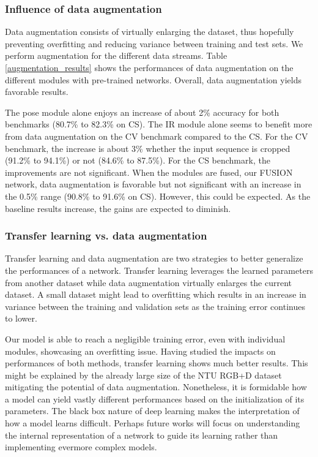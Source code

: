 \documentclass[letterpaper, 10 pt, conference]{ieeeconf}
\begin{document}
\subsubsection{Influence of data augmentation}

Data augmentation consists of virtually enlarging the dataset, thus hopefully preventing overfitting and reducing variance between training and test sets. We perform augmentation for the different data streams. Table \ref{augmentation_results} shows the performances of data augmentation on the different modules with pre-trained networks. Overall, data augmentation yields favorable results.

The pose module alone enjoys an increase of about 2\% accuracy for both benchmarks (80.7\% to 82.3\% on CS). The IR module alone seems to benefit more from data augmentation on the CV benchmark compared to the CS. For the CV benchmark, the increase is about 3\% whether the input sequence is cropped (91.2\% to 94.1\%) or not (84.6\% to 87.5\%). For the CS benchmark, the improvements are not significant. When the modules are fused, our FUSION network, data augmentation is favorable but not significant with an increase in the 0.5\% range (90.8\% to 91.6\% on CS). However, this could be expected. As the baseline results increase, the gains are expected to diminish. 

\subsubsection{Transfer learning vs. data augmentation}

Transfer learning and data augmentation are two strategies to better generalize the performances of a network. Transfer learning leverages the learned parameters from another dataset while data augmentation virtually enlarges the current dataset. A small dataset might lead to overfitting which results in an increase in variance between the training and validation sets as the training error continues to lower. 

Our model is able to reach a negligible training error, even with individual modules, showcasing an overfitting issue. Having studied the impacts on performances of both methods, transfer learning shows much better results. This might be explained by the already large size of the NTU RGB+D dataset mitigating the potential of data augmentation. Nonetheless, it is formidable how a model can yield vastly different performances based on the initialization of its parameters. The black box nature of deep learning makes the interpretation of how a model learns difficult. Perhaps future works will focus on understanding the internal representation of a network to guide its learning rather than implementing evermore complex models. 
\end{document}
